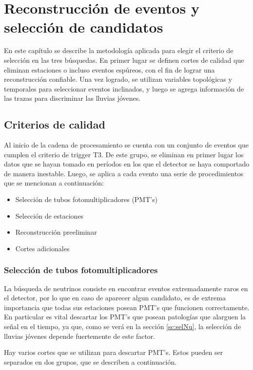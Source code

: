 \chapter{Reconstrucci\'on de eventos y selecci\'on de candidatos}
\label{ch:selAuger}

En este capítulo se describe la metodología aplicada para elegir el criterio de selección en las tres búsquedas.
En primer lugar se definen cortes de calidad que eliminan estaciones o incluso eventos espúreos, con el fin de lograr una reconstrucción confiable.
Una vez logrado, se utilizan variables topológicas y temporales para seleccionar eventos inclinados, y luego  se agrega información de las trazas para discriminar las lluvias jóvenes.

\section{Criterios de calidad}
\label{sc:calidadAuger}
	Al inicio de la cadena de procesamiento se cuenta con un conjunto de eventos que cumplen el criterio de trigger T3.
	De este grupo, se eliminan en primer lugar los datos que se hayan tomado en períodos en los que el detector se haya comportado de manera inestable\cite{pmtsAuger}.
	Luego, se aplica a cada evento una serie de procedimientos que se mencionan a continuación:
	\begin{itemize}
	 \item Selección de tubos fotomultiplicadores (PMT's)
	 \item Selección de estaciones
	 \item Reconstrucción preeliminar
	 \item Cortes adicionales
	\end{itemize}
	
	\subsection{Selección de tubos fotomultiplicadores}
	
	La búsqueda de neutrinos consiste en encontrar eventos extremadamente raros en el detector, por lo que en caso de aparecer algun candidato, es de extrema importancia que todas sus estaciones posean PMT's que funcionen correctamente.
	En particular es vital descartar los PMT's que posean patologías que alarguen la señal en el tiempo, ya que, como se verá en la sección \ref{sc:selNu}, la selección de lluvias jóvenes depende fuertemente de este factor.
	
	Hay varios cortes que se utilizan para descartar PMT's. 
	Estos pueden ser separados en dos grupos, que se describen a continuación.
	

